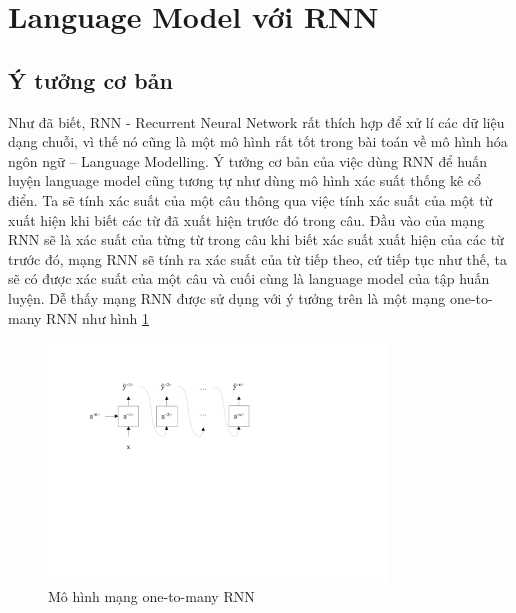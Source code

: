 \section{Language Model với RNN}
\subsection{Ý tưởng cơ bản}
Như đã biết, RNN - Recurrent Neural Network rất thích hợp để xử lí các dữ liệu dạng chuỗi, vì thế nó cũng là một mô hình rất tốt trong bài toán về mô hình hóa ngôn ngữ – Language Modelling. Ý tưởng cơ bản của việc dùng RNN để huấn luyện language model cũng tương tự như dùng mô hình xác suất thống kê cổ điển. Ta sẽ tính xác suất của một câu thông qua việc tính xác suất của một từ xuất hiện khi biết các từ đã xuất hiện trước đó trong câu. Đầu vào của mạng RNN sẽ là xác suất của từng từ trong câu khi biết xác suất xuất hiện của các từ trước đó, mạng RNN sẽ tính ra xác suất của từ tiếp theo, cứ tiếp tục như thế, ta sẽ có được xác suất của một câu và cuối cùng là language model của tập huấn luyện. Dễ thấy mạng RNN được sử dụng với ý tưởng trên là một mạng one-to-many RNN như hình \ref{fig:one-to-many-rnn}

\begin{figure}[h!]
    \centering
    \includegraphics[width=9cm]{chapter07/figure-sec12/one-to-many-rnn.pdf}
    \caption{Mô hình mạng one-to-many RNN}
    \label{fig:one-to-many-rnn}
\end{figure}


